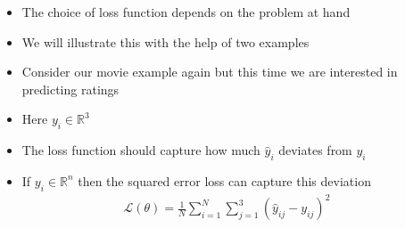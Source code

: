 \begin{frame}
  \begin{columns}
    \begin{overlayarea}{\textwidth}{\textheight}
      \vspace{0.3cm}
    \end{overlayarea}

    \begin{overlayarea}{\textwidth}{\textheight}
      \begin{itemize}[<+->]
        \item The choice of loss function depends on the problem at hand
        \item We will illustrate this with the help of two examples
        \item Consider our movie example again but this time we are interested in predicting ratings
        \item Here $y_i \in \mathbb{R}^3$
        \item The loss function should capture how much $\hat{y}_i$ deviates from $y_i$
        \item If $y_i \in \mathbb{R}^n$ then the squared error loss can capture this deviation
            \vspace{-0.2in}
            \begin{align*}
              \mathscr{L}(\theta) = \frac{1}{N}\sum_{i=1}^{N}\sum_{j=1}^{3}\left(\hat{y}_{ij} - y_{ij}\right)^2
            \end{align*}
      \end{itemize}
    \end{overlayarea}
  \end{columns}
\end{frame}

